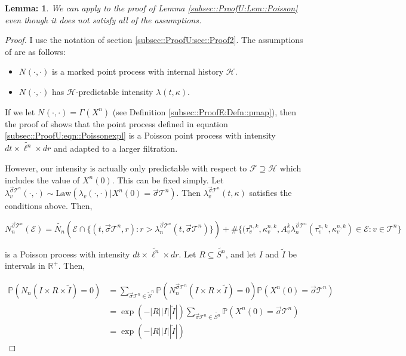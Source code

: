\documentclass[12pt]{article}
\newcommand{\mb}{\mathbb}
\newcommand{\mc}{\mathcal}
\newcommand{\te}{\text}
\newcommand{\ind}{\hspace{24pt}}
\newcommand{\pr}{\mb{P}}							%
\renewcommand{\v}{v}							%
\renewcommand{\S}{S}							%
\newcommand{\s}{\sigma}							%
\newcommand{\sv}{\vec{\s}}						%
\renewcommand{\t}{t}							%
\newcommand{\poiss}[1]{N_{#1}}						%
\newcommand{\law}{\te{Law}}							%
\newcommand{\pup}[1]{^{#1}}							%
\newcommand{\tree}{\mc{T}}							%
\renewcommand{\r}{r}								%
\newcommand{\rt}[1]{\tau^{#1}}						%
\renewcommand{\it}{k}								%
\newcommand{\numb}{n}								%
\newcommand{\XState}[1]{\S^{#1}}				%
\newcommand{\rxvtn}[3]{X_{#1}^{#3}(#2)}				%
\newcommand{\rxvtsn}[3]{X_{#1}^{#3}{#2}}			%
\newcommand{\rate}[1]{\lambda_{#1}}					%
\newcommand{\Sm}{\ell}								%
\newcommand{\alt}{\widetilde}						%
\newcommand{\rv}{A}								%
\newcommand{\evnt}{\mc{E}}						%
\renewcommand{\mark}[1]{\kappa^{#1}}				%
\newcommand{\pmap}[1]{\Gamma_{#1}}				%
\newcommand{\inte}{I}							%
\newtheorem{lem}[thms]{Lemma: }
\begin{document}
\begin{lem}
We can apply \cite[Proposition 14.7.I(b)]{DalVer08} to the proof of Lemma \ref{subsec::ProofU:Lem::Poisson} even though it does not satisfy all of the assumptions.
\label{sec::TL:Lem::embedding}
\end{lem}
\begin{proof}
I use the notation of section \ref{subsec::ProofU:sec::Proof2}. The assumptions of \cite[Proposition 14.7.I(b)]{DalVer08} are as follows:

\begin{itemize}
\item \(\poiss{}(\cdot,\cdot)\) is a marked point process with internal history \(\mc{H}\).

\item \(\poiss{}(\cdot,\cdot)\) has \(\mc{H}\)-predictable intensity \(\rate{}(\t,\kappa)\).
\end{itemize}

If we let \(\poiss{}(\cdot,\cdot) = \pmap{}(\rxvtsn{}{}{\numb})\) (see Definition \ref{subsec::ProofE:Defn::pmap}), then the proof of \cite[Proposition 14.7.I(b)]{DalVer08} shows that the point process defined in equation \eqref{subsec::ProofU:eqn::Poissonexpl} is a Poisson point process with intensity \(d\t\times \alt{\Sm^\numb}\times d\r\) and adapted to a larger filtration.

\ind However, our intensity is actually only predictable with respect to \(\mc{F} \supseteq \mc{H}\) which includes the value of \(\rxvtn{}{0}{\numb}\). This can be fixed simply. Let \(\rate{\v}^{\sv{\tree\pup{\numb}}}(\cdot,\cdot) \sim \law(\rate{\v}(\cdot,\cdot)|\rxvtn{}{0}{\numb} = \sv{\tree\pup{\numb}})\). Then \(\rate{\v}^{\sv{\tree\pup{\numb}}}(t,\kappa)\) satisfies the conditions above. Then,

\[\poiss{\numb}^{\sv{\tree\pup{\numb}}}(\evnt) = \alt{\poiss{\numb}}\left(\evnt\cap\{(t,\sv{\tree\pup{\numb}},\r):\r > \rate{\numb}^{\sv{\tree\pup{\numb}}}(\t,\sv{\tree\pup{\numb}})\}\right) + \#\{(\rt{\numb,\it}_\v,\mark{\numb,\it}_\v,\rv_{\v}^{\it}\rate{\numb}^{\sv{\tree\pup{\numb}}}(\rt{\numb,\it}_\v,\mark{\numb,\it}_\v) \in \evnt: \v\in \tree\pup{\numb}\}\]

is a Poisson process with intensity \(d\t\times \alt{\Sm^\numb}\times d\r\). Let \(R \subseteq \alt{\S^\numb}\), and let \(\inte\) and \(\alt{\inte}\) be intervals in \(\mb{R}^+\). Then,

\begin{align*}
\pr\left(\poiss{\numb}\left(\inte\times R\times \alt{\inte}\right) = 0\right) &= \sum_{\sv{\tree\pup{\numb}} \in \alt{S}^\numb} \pr\left(\poiss{\numb}^{\sv{\tree\pup{\numb}}}\left(\inte\times R\times \alt{\inte}\right) = 0\right)\pr(\rxvtn{}{0}{\numb} = \sv{\tree\pup{\numb}})\\
&= \exp\left(-|R| |\inte||\alt{\inte}|\right)\sum_{\sv{\tree\pup{\numb}} \in \alt{S^\numb}} \pr(\rxvtn{}{0}{\numb} = \sv{\tree\pup{\numb}})\\
&=\exp\left(-|R| |\inte||\alt{\inte}|\right)
\end{align*}


\end{proof}
\end{document}
